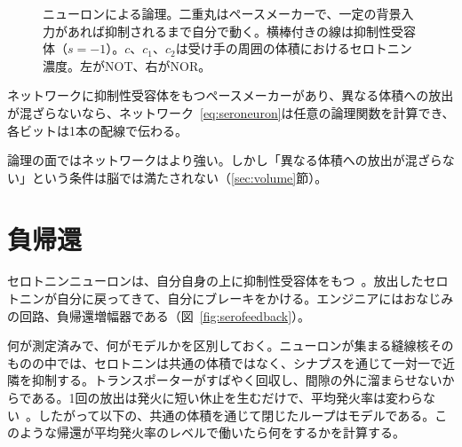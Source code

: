 \begin{figure}[t]
\centering
{}
\caption{ニューロンによる論理。二重丸はペースメーカーで、一定の背景入力があれば抑制されるまで自分で動く。横棒付きの線は抑制性受容体（$s=-1$）。$c$、$c_1$、$c_2$は受け手の周囲の体積におけるセロトニン濃度。左がNOT、右がNOR。}
\label{fig:serogates}
\end{figure}

\begin{keyblock}
\begin{proposition}
\label{prop:serocomplete}
ネットワークに抑制性受容体をもつペースメーカーがあり、異なる体積への放出が混ざらないなら、ネットワーク~\eqref{eq:seroneuron}は任意の論理関数を計算でき、各ビットは1本の配線で伝わる。
\end{proposition}
\end{keyblock}

論理の面ではネットワークはより強い。しかし「異なる体積への放出が混ざらない」という条件は脳では満たされない（\ref{sec:volume}節）。

\section{負帰還}

セロトニンニューロンは、自分自身の上に抑制性受容体をもつ~\cite{Sprouse1987}。放出したセロトニンが自分に戻ってきて、自分にブレーキをかける。エンジニアにはおなじみの回路、負帰還増幅器である（図~\ref{fig:serofeedback}）。

何が測定済みで、何がモデルかを区別しておく。ニューロンが集まる縫線核そのものの中では、セロトニンは共通の体積ではなく、シナプスを通じて一対一で近隣を抑制する。トランスポーターがすばやく回収し、間隙の外に溜まらせないからである。1回の放出は発火に短い休止を生むだけで、平均発火率は変わらない~\cite{CourtneyFord2016}。したがって以下の、共通の体積を通じて閉じたループはモデルである。このような帰還が平均発火率のレベルで働いたら何をするかを計算する。

